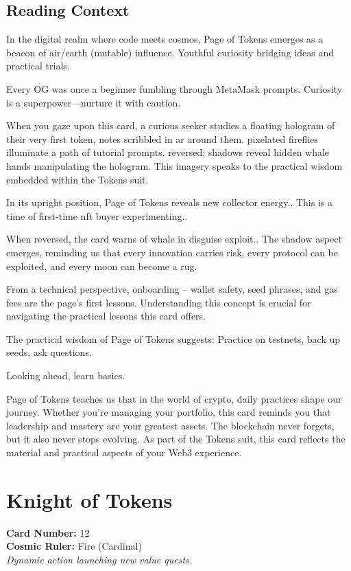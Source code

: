 \documentclass[11pt,oneside]{book}
\begin{document}
\begin{minipage}[t]{0.55\textwidth}
  \subsection*{Reading Context}
  In the digital realm where code meets cosmos, Page of Tokens emerges as a beacon of air/earth (mutable) influence. Youthful curiosity bridging ideas and practical trials.

  Every OG was once a beginner fumbling through MetaMask prompts. Curiosity is a superpower—nurture it with caution.

  When you gaze upon this card, a curious seeker studies a floating hologram of their very first token, notes scribbled in ar around them. pixelated fireflies illuminate a path of tutorial prompts. reversed: shadows reveal hidden whale hands manipulating the hologram. This imagery speaks to the practical wisdom embedded within the Tokens suit.

  In its upright position, Page of Tokens reveals new collector energy.. This is a time of first-time nft buyer experimenting..

  When reversed, the card warns of whale in disguise exploit.. The shadow aspect emerges, reminding us that every innovation carries risk, every protocol can be exploited, and every moon can become a rug.

  From a technical perspective, onboarding – wallet safety, seed phrases, and gas fees are the page's first lessons. Understanding this concept is crucial for navigating the practical lessons this card offers.

  The practical wisdom of Page of Tokens suggests: Practice on testnets, back up seeds, ask questions.

  Looking ahead, learn basics.

  Page of Tokens teaches us that in the world of crypto, daily practices shape our journey. Whether you're managing your portfolio, this card reminds you that leadership and mastery are your greatest assets. The blockchain never forgets, but it also never stops evolving. As part of the Tokens suit, this card reflects the material and practical aspects of your Web3 experience.

\end{minipage}

\newpage
\section*{Knight of Tokens}

\begin{minipage}[t]{0.55\textwidth}
  \vspace{0pt}
  \textbf{Card Number:} 12\\  \textbf{Cosmic Ruler:} Fire (Cardinal)\\  \textit{Dynamic action launching new value quests.}
\end{minipage}
\end{document}
